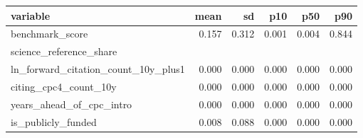 \begin{tabular}{lrrrrr}
\toprule
variable & mean & sd & p10 & p50 & p90 \\
\midrule
benchmark_score & 0.157 & 0.312 & 0.001 & 0.004 & 0.844 \\
science_reference_share &  &  &  &  &  \\
ln_forward_citation_count_10y_plus1 & 0.000 & 0.000 & 0.000 & 0.000 & 0.000 \\
citing_cpc4_count_10y & 0.000 & 0.000 & 0.000 & 0.000 & 0.000 \\
years_ahead_of_cpc_intro & 0.000 & 0.000 & 0.000 & 0.000 & 0.000 \\
is_publicly_funded & 0.008 & 0.088 & 0.000 & 0.000 & 0.000 \\
\bottomrule
\end{tabular}

